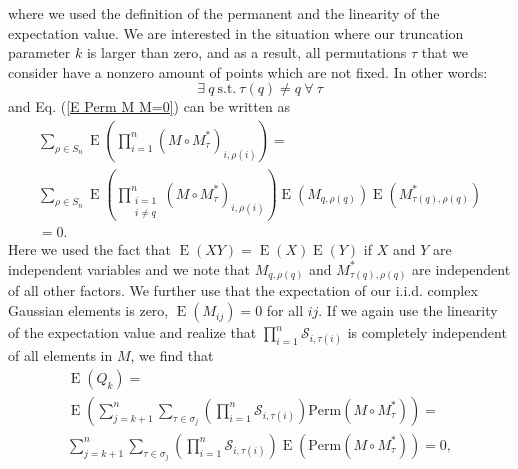 \documentclass[10pt,aps,pra,twocolumn,superscriptaddress]{revtex4-2}
\DeclareMathOperator{\E}{E}
\begin{document}
where we used the definition of the permanent and the linearity of the expectation value.
We are interested in the situation where our truncation parameter $k$ is larger than zero, and as a result, all permutations $\tau$ that we consider have a nonzero amount of points which are not fixed. In other words:
\begin{equation}
    \exists \: q \: \mathrm{s.t}.\: \tau(q)\neq q \: \forall \: \tau
    \label{eq: at least 1 nonfixed point}
\end{equation}
and Eq. (\ref{E Perm M M=0}) can be written as
\begin{multline}
        \sum_{\rho \in S_n}\E(\prod_{i=1}^n(M\circ M_{\tau}^*)_{i,\rho(i)}) =\\
    \sum_{\rho \in S_n}\E \left( \prod_{\substack{i=1\\i\neq q}}^n(M\circ M_{\tau}^*)_{i,\rho(i)}\right)\E(M_{q,\rho(q)}) \E(M_{\tau(q),\rho(q)}^*) \\= 0.
    \label{eq: exp Q=0 because at least 1 nonfixed point}
\end{multline}
Here we used the fact that $\E(X Y)=\E(X)\E(Y)$ if $X$ and $Y$ are independent variables and we note that $M_{q,\rho(q)}$ and $M^{*}_{\tau(q),\rho(q)}$ are independent of all other factors. We further use that the expectation of our i.i.d. complex Gaussian elements is zero, $\E(M_{ij})=0$ for all $ij$. If we again use the linearity of the expectation value and realize that $\prod^n_{i=1}\mathcal{S}_{i,\tau(i)}$ is completely independent of all elements in $M$, we find that 
\begin{multline}
    \E(Q_k)=\\
    \E\left( \sum_{j=k+1}^n\sum_{\tau \in \sigma_j} \left(\prod^n_{i=1}\mathcal{S}_{i,\tau(i)}\right) \text{Perm}(M \circ M^*_{\tau})\right)=\\ \sum_{j=k+1}^n\sum_{\tau \in \sigma_j} \left(\prod^n_{i=1}\mathcal{S}_{i,\tau(i)}\right)\E\left( \text{Perm}(M \circ M^*_{\tau})\right)=0,
\end{multline}
\end{document}
